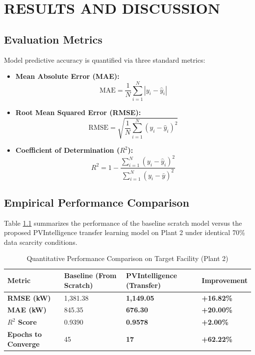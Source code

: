 \documentclass[12pt,a4paper,oneside]{report}
\begin{document}
\newpage
\chapter{RESULTS AND DISCUSSION}

\section{Evaluation Metrics}
Model predictive accuracy is quantified via three standard metrics:
\begin{itemize}
    \item \textbf{Mean Absolute Error (MAE):}
    \begin{equation}
    \text{MAE} = \frac{1}{N} \sum_{i=1}^N |y_i - \hat{y}_i|
    \end{equation}
    \item \textbf{Root Mean Squared Error (RMSE):}
    \begin{equation}
    \text{RMSE} = \sqrt{\frac{1}{N} \sum_{i=1}^N (y_i - \hat{y}_i)^2}
    \end{equation}
    \item \textbf{Coefficient of Determination ($R^2$):}
    \begin{equation}
    R^2 = 1 - \frac{\sum_{i=1}^N (y_i - \hat{y}_i)^2}{\sum_{i=1}^N (y_i - \bar{y})^2}
    \end{equation}
\end{itemize}

\section{Empirical Performance Comparison}
Table \ref{tab:results} summarizes the performance of the baseline scratch model versus the proposed PVIntelligence transfer learning model on Plant 2 under identical 70\% data scarcity conditions.

\begin{table}[htbp]
\centering
\caption{Quantitative Performance Comparison on Target Facility (Plant 2)}
\label{tab:results}
\begin{tabularx}{\textwidth}{lXXX}
\toprule
\textbf{Metric} & \textbf{Baseline (From Scratch)} & \textbf{PVIntelligence (Transfer)} & \textbf{Improvement} \\
\midrule
\textbf{RMSE (kW)} & 1,381.38 & \textbf{1,149.05} & \textbf{+16.82\%} \\
\textbf{MAE (kW)} & 845.35 & \textbf{676.30} & \textbf{+20.00\%} \\
\textbf{$R^2$ Score} & 0.9390 & \textbf{0.9578} & \textbf{+2.00\%} \\
\textbf{Epochs to Converge} & 45 & \textbf{17} & \textbf{+62.22\%} \\
\bottomrule
\end{tabularx}
\end{table}
\end{document}
